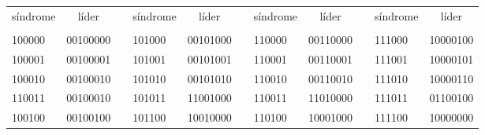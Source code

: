 \documentclass[11pt,spanish]{book}
\begin{document}
\begin{table}[H]
\centering
\begin{tabular}{lllllllllll}
\cline{1-2} \cline{4-5} \cline{7-8} \cline{10-11}
\multicolumn{1}{|c|}{síndrome} & \multicolumn{1}{c|}{líder} & \multicolumn{1}{c|}{} & \multicolumn{1}{c|}{síndrome} & \multicolumn{1}{c|}{líder} & \multicolumn{1}{c|}{} & \multicolumn{1}{c|}{síndrome} & \multicolumn{1}{c|}{líder} & \multicolumn{1}{c|}{} & \multicolumn{1}{c|}{síndrome} & \multicolumn{1}{c|}{líder} \\ \cline{1-2} \cline{4-5} \cline{7-8} \cline{10-11} 
 &  &  &  &  &  &  &  &  &  &  \\ \cline{1-2} \cline{4-5} \cline{7-8} \cline{10-11} 
\multicolumn{1}{|l|}{100000} & \multicolumn{1}{l|}{00100000} & \multicolumn{1}{l|}{} & \multicolumn{1}{l|}{101000} & \multicolumn{1}{l|}{00101000} & \multicolumn{1}{l|}{} & \multicolumn{1}{l|}{110000} & \multicolumn{1}{l|}{00110000} & \multicolumn{1}{l|}{} & \multicolumn{1}{l|}{111000} & \multicolumn{1}{l|}{10000100} \\ \cline{1-2} \cline{4-5} \cline{7-8} \cline{10-11} 
\multicolumn{1}{|l|}{100001} & \multicolumn{1}{l|}{00100001} & \multicolumn{1}{l|}{} & \multicolumn{1}{l|}{101001} & \multicolumn{1}{l|}{00101001} & \multicolumn{1}{l|}{} & \multicolumn{1}{l|}{110001} & \multicolumn{1}{l|}{00110001} & \multicolumn{1}{l|}{} & \multicolumn{1}{l|}{111001} & \multicolumn{1}{l|}{10000101} \\ \cline{1-2} \cline{4-5} \cline{7-8} \cline{10-11} 
\multicolumn{1}{|l|}{100010} & \multicolumn{1}{l|}{00100010} & \multicolumn{1}{l|}{} & \multicolumn{1}{l|}{101010} & \multicolumn{1}{l|}{00101010} & \multicolumn{1}{l|}{} & \multicolumn{1}{l|}{110010} & \multicolumn{1}{l|}{00110010} & \multicolumn{1}{l|}{} & \multicolumn{1}{l|}{111010} & \multicolumn{1}{l|}{10000110} \\ \cline{1-2} \cline{4-5} \cline{7-8} \cline{10-11} 
\multicolumn{1}{|l|}{110011} & \multicolumn{1}{l|}{00100010} & \multicolumn{1}{l|}{} & \multicolumn{1}{l|}{101011} & \multicolumn{1}{l|}{11001000} & \multicolumn{1}{l|}{} & \multicolumn{1}{l|}{110011} & \multicolumn{1}{l|}{11010000} & \multicolumn{1}{l|}{} & \multicolumn{1}{l|}{111011} & \multicolumn{1}{l|}{01100100} \\ \cline{1-2} \cline{4-5} \cline{7-8} \cline{10-11} 
\multicolumn{1}{|l|}{100100} & \multicolumn{1}{l|}{00100100} & \multicolumn{1}{l|}{} & \multicolumn{1}{l|}{101100} & \multicolumn{1}{l|}{10010000} & \multicolumn{1}{l|}{} & \multicolumn{1}{l|}{110100} & \multicolumn{1}{l|}{10001000} & \multicolumn{1}{l|}{} & \multicolumn{1}{l|}{111100} & \multicolumn{1}{l|}{10000000} \\ \cline{1-2} \cline{4-5} \cline{7-8} \cline{10-11} 

\end{tabular}
\end{table}
\end{document}
